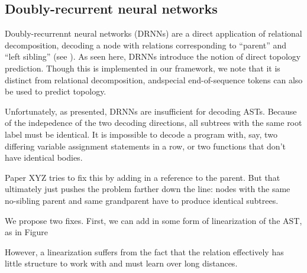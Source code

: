 







\subsection{Doubly-recurrent neural networks}


Doubly-recurrennt neural networks (DRNNs) are a direct application of relational 
decomposition, decoding a node with relations corresponding to ``parent'' and 
``left sibling'' (see ). As seen here, DRNNs introduce the 
notion of direct topology prediction. Though this is implemented in our 
framework, we note that it is distinct from relational decomposition, andspecial 
end-of-sequence tokens can also be used to predict topology.

Unfortunately, as presented, DRNNs are insufficient for decoding ASTs. Because 
of the indepedence of the two decoding directions, all subtrees with the same 
root label must be identical. It is impossible to decode a program with, say, 
two differing variable assignment statements in a row, or two functions that 
don't have identical bodies.


Paper XYZ tries to fix this by adding in a reference to the parent. But that 
ultimately just pushes the problem farther down the line: nodes with the same 
no-sibling parent and same grandparent have to produce identical subtrees.

We propose two fixes. First, we can add in some form of linearization of the 
AST, as in Figure %

However, a linearization suffers from the fact that the relation effectively has 
little structure to work with and must learn over long distances.


